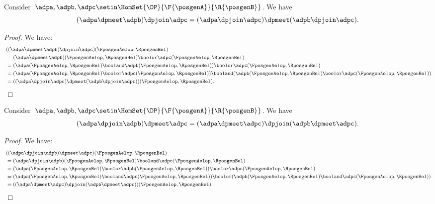 \begin{lemma}
    \label{lem:vee_wedge}
    Consider~$\adpa,\adpb,\adpc\setin \HomSet{\DP}{\F{\posgenA}}{\R{\posgenB}}$.
    We have
    \begin{equation}
        (\adpa \dpmeet \adpb)
        \dpjoin \adpc=(\adpa \dpjoin \adpc) \dpmeet (\adpb\dpjoin \adpc).
    \end{equation}
\end{lemma}
\begin{proof}
    We have:
    \begin{equation}
        \begin{aligned}
            ~ & ((\adpa \dpmeet \adpb)\dpjoin \adpc)(\FposgenAelop,\RposgenBel) \\
              & =
            (\adpa \dpmeet \adpb)(\FposgenAelop,\RposgenBel)\boolor \adpc(\FposgenAelop,\RposgenBel) \\
              & =(\adpa(\FposgenAelop,\RposgenBel) \booland \adpb(\FposgenAelop,\RposgenBel))\boolor \adpc(\FposgenAelop,\RposgenBel) \\
              & =(\adpa(\FposgenAelop,\RposgenBel) \boolor \adpc(\FposgenAelop,\RposgenBel)) \booland (\adpb(\FposgenAelop,\RposgenBel)\boolor \adpc(\FposgenAelop,\RposgenBel)) \\
              & =((\adpa \dpjoin \adpc) \dpmeet (\adpb\dpjoin \adpc))(\FposgenAelop,\RposgenBel).
        \end{aligned}
    \end{equation}
\end{proof}

\begin{lemma}
    \label{lem:wedge_vee}
    Consider~$\adpa,\adpb,\adpc\setin \HomSet{\DP}{\F{\posgenA}}{\R{\posgenB}}$.
    We have
    \begin{equation}
        (\adpa \dpjoin \adpb)
        \dpmeet \adpc=(\adpa \dpmeet \adpc) \dpjoin (\adpb\dpmeet \adpc).
    \end{equation}
\end{lemma}
\begin{proof}
    We have:
    \begin{equation}
        \begin{aligned}
            ~ & ((\adpa \dpjoin \adpb)\dpmeet \adpc)(\FposgenAelop,\RposgenBel) \\
              & = (\adpa \dpjoin \adpb)(\FposgenAelop,\RposgenBel)\booland \adpc(\FposgenAelop,\RposgenBel) \\
              & =(\adpa(\FposgenAelop,\RposgenBel) \boolor \adpb(\FposgenAelop,\RposgenBel))\boolor \adpc(\FposgenAelop,\RposgenBel) \\
              & =(\adpa(\FposgenAelop,\RposgenBel) \booland \adpc(\FposgenAelop,\RposgenBel)) \boolor (\adpb(\FposgenAelop,\RposgenBel)\booland \adpc(\FposgenAelop,\RposgenBel)) \\
              & =((\adpa \dpmeet \adpc) \dpjoin (\adpb\dpmeet \adpc))(\FposgenAelop,\RposgenBel).
        \end{aligned}
    \end{equation}
\end{proof}

